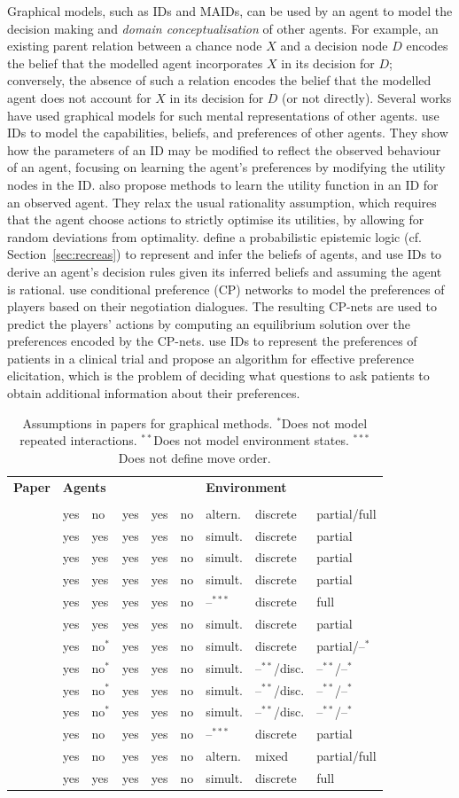 \documentclass[final,1p,times,authoryear]{elsarticle}
\makeatletter
\newcommand{\nil}{@{}}
\newcommand{\nl}{\newline}
\newcommand{\rbox}[2]{\rotatebox{45}{\parbox{#1\textwidth}{#2}}}
\newcommand{\btab}{
	\center
	\scriptsize
	\bgroup\def\arraystretch{1.2}
	\begin{tabular}{\nil p{0.32\textwidth} @{\hspace{11pt}} l \nil l \nil l \nil l \nil l \nil l \nil l \nil l \nil}
		\toprule
		\bf Paper	& \multicolumn{5}{l}{\hspace{-5pt}\bf Agents} & \multicolumn{3}{l}{\hspace{-5pt}\bf Environment} \\[-5pt]
				& \rbox{0.075}{Stochastic \nl actions?} & \rbox{0.075}{Changing \nl behaviour?} & \rbox{0.075}{Factors \nl known?} & \rbox{0.07}{Independent \nl agents?} & \rbox{0.06}{Common \nl goals?} & \rbox{0.10}{Move order} & \rbox{0.11}{State/action \nl representation} & \rbox{0.09}{State/action \nl observability} \\
		\midrule}
\newcommand{\tabrow}[9]{\citep{#1} & #2 & #3 & #4 & #5 & #6 & #7 & #8 & #9 \\}
\newcommand{\etab}{
		\bottomrule
	\end{tabular}
	\egroup}
\newcommand{\si}{simult.}
\newcommand{\al}{altern.}
\newcommand{\as}{$^{*}$}
\newcommand{\ass}{$^{**}$}
\newcommand{\asss}{$^{***}$}
\makeatother
\begin{document}
Graphical models, such as IDs and MAIDs, can be used by an agent to model the decision making and \emph{domain conceptualisation} of other agents. For example, an existing parent relation between a chance node $X$ and a decision node $D$ encodes the belief that the modelled agent incorporates $X$ in its decision for $D$; conversely, the absence of such a relation encodes the belief that the modelled agent does not account for $X$ in its decision for $D$ (or not directly). Several works have used graphical models for such mental representations of other agents. \citet{sg1999} use IDs to model the capabilities, beliefs, and preferences of other agents. They show how the parameters of an ID may be modified to reflect the observed behaviour of an agent, focusing on learning the agent's preferences by modifying the utility nodes in the ID. \citet{nj2004} also propose methods to learn the utility function in an ID for an observed agent. They relax the usual rationality assumption, which requires that the agent choose actions to strictly optimise its utilities, by allowing for random deviations from optimality. \citet{mk2000} define a probabilistic epistemic logic (cf. Section~\ref{sec:recreas}) to represent and infer the beliefs of agents, and use IDs to derive an agent's decision rules given its inferred beliefs and assuming the agent is rational. \citet{cabl2013} use conditional preference (CP) networks \citep{bbdh2004} to model the preferences of players based on their negotiation dialogues. The resulting CP-nets are used to predict the players' actions by computing an equilibrium solution over the preferences encoded by the CP-nets. \citet{ckp2000} use IDs to represent the preferences of patients in a clinical trial and propose an algorithm for effective preference elicitation, which is the problem of deciding what questions to ask patients to obtain additional information about their preferences.

\begin{table}[t]
	\btab
		\tabrow{cabl2013}{yes}{no}{yes}{yes}{no}{\al}{discrete}{partial/full}
		\tabrow{zd2012}{yes}{yes}{yes}{yes}{no}{\si}{discrete}{partial}
		\tabrow{dcz2010,dzc2009}{yes}{yes}{yes}{yes}{no}{\si}{discrete}{partial}
		\tabrow{gp2008}{yes}{yes}{yes}{yes}{no}{\si}{discrete}{partial}
		\tabrow{nj2004}{yes}{yes}{yes}{yes}{no}{--\asss}{discrete}{full}
		\tabrow{gp2003}{yes}{yes}{yes}{yes}{no}{\si}{discrete}{partial}
		\tabrow{kb2003}{yes}{no\as}{yes}{yes}{no}{\si}{discrete}{partial/--\as}
		\tabrow{vk2002}{yes}{no\as}{yes}{yes}{no}{\si}{--\ass/disc.}{--\ass/--\as}
		\tabrow{kls2001}{yes}{no\as}{yes}{yes}{no}{\si}{--\ass/disc.}{--\ass/--\as}
		\tabrow{l2000}{yes}{no\as}{yes}{yes}{no}{\si}{--\ass/disc.}{--\ass/--\as}
		\tabrow{mk2000}{yes}{no}{yes}{yes}{no}{--\asss}{discrete}{partial}
		\tabrow{ckp2000}{yes}{no}{yes}{yes}{no}{\al}{mixed}{partial/full}
		\tabrow{sg1999}{yes}{yes}{yes}{yes}{no}{\si}{discrete}{full}
	\etab
	\caption{Assumptions in papers for graphical methods. \as Does not model repeated interactions. \ass Does not model environment states. \asss Does not define move order.}
	\label{tab:graphmod}
\end{table}
\end{document}
